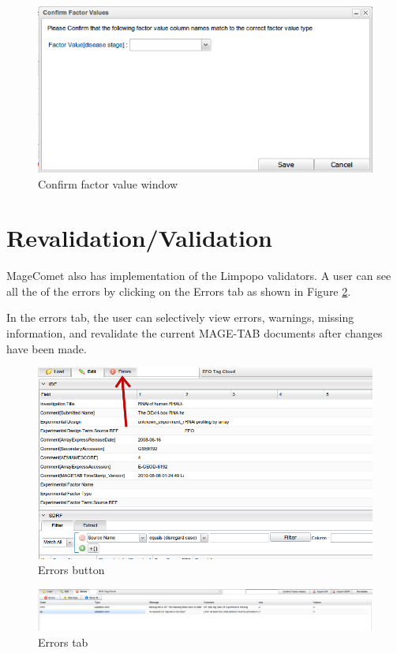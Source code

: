 \documentclass[a4paper]{article}
\begin{document}
\begin{figure}[h]
\caption{Confirm factor value window}
\centering
\label{confirmfactorvalue}
\includegraphics[width=12cm]{images/confirmfactorvalues}
\end{figure}

\section{Revalidation/Validation}
MageComet also has implementation of the Limpopo validators. A user can see all the of the errors by clicking on the Errors tab as shown in Figure \ref{errors}. 

In the errors tab, the user can selectively view errors, warnings, missing information, and revalidate the current MAGE-TAB documents after changes have been made.

\begin{figure}[h]
\caption{Errors button}
\centering
\label{errors}
\includegraphics[width=17cm]{images/errors}
\end{figure}

\begin{figure}[h]
\caption{Errors tab}
\centering
\label{errorstab}
\includegraphics[width=17cm]{images/errors_tab}
\end{figure}
\end{document}
